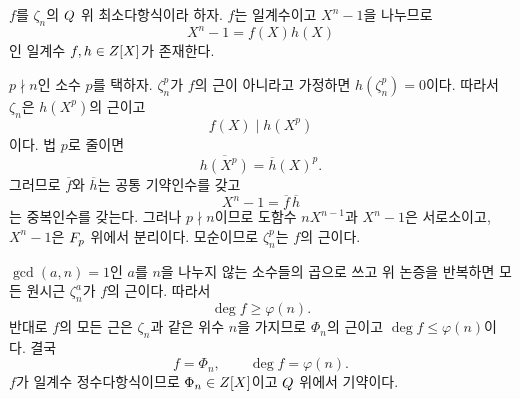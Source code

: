 \begin{solution}
$f$를 $\zeta_n$의 $Q$ 위 최소다항식이라 하자. $f$는 일계수이고 $X^n-1$을 나누므로
\[
  X^n-1=f(X)h(X)
\]
인 일계수 $f,h\in Z[X]$가 존재한다.

$p\nmid n$인 소수 $p$를 택하자. $\zeta_n^p$가 $f$의 근이 아니라고 가정하면 $h(\zeta_n^p)=0$이다. 따라서 $\zeta_n$은 $h(X^p)$의 근이고
\[
  f(X)\mid h(X^p)
\]
이다. 법 $p$로 줄이면
\[
  \overline{h(X^p)}=\overline h(X)^p.
\]
그러므로 $\overline f$와 $\overline h$는 공통 기약인수를 갖고
\[
  X^n-1=\overline f\,\overline h
\]
는 중복인수를 갖는다. 그러나 $p\nmid n$이므로 도함수 $nX^{n-1}$과 $X^n-1$은 서로소이고, $X^n-1$은 $F_p$ 위에서 분리이다. 모순이므로 $\zeta_n^p$는 $f$의 근이다.

$\gcd(a,n)=1$인 $a$를 $n$을 나누지 않는 소수들의 곱으로 쓰고 위 논증을 반복하면 모든 원시근 $\zeta_n^a$가 $f$의 근이다. 따라서
\[
  \deg f\ge\varphi(n).
\]
반대로 $f$의 모든 근은 $\zeta_n$과 같은 위수 $n$을 가지므로 $\Phi_n$의 근이고 $\deg f\le\varphi(n)$이다. 결국
\[
  f=\Phi_n,
  \qquad
  \deg f=\varphi(n).
\]
$f$가 일계수 정수다항식이므로 $\Phi_n\in Z[X]$이고 $Q$ 위에서 기약이다.
\end{solution}
